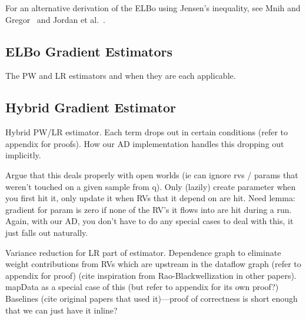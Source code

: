 For an alternative derivation of the ELBo using Jensen's inequality, see Mnih and Gregor~\cite{NVIL} and Jordan et al.~\cite{VariationalInference}.

\subsection{ELBo Gradient Estimators}

The PW and LR estimators and when they are each applicable.

\subsection{Hybrid Gradient Estimator}

Hybrid PW/LR estimator. Each term drops out in certain conditions (refer to appendix for proofs). How our AD implementation handles this dropping out implicitly.

Argue that this deals properly with open worlds (ie can ignore rvs / params that weren’t touched on a given sample from q). Only (lazily) create parameter when you first hit it, only update it when RVs that it depend on are hit. Need lemma: gradient for param is zero if none of the RV’s it flows into are hit during a run. Again, with our AD, you don’t have to do any special cases to deal with this, it just falls out naturally.

Variance reduction for LR part of estimator. Dependence graph to eliminate weight contributions from RVs which are upstream in the dataflow graph (refer to appendix for proof) (cite inspiration from Rao-Blackwellization in other papers). mapData as a special case of this (but refer to appendix for its own proof?) Baselines (cite original papers that used it)---proof of correctness is short enough that we can just have it inline?


